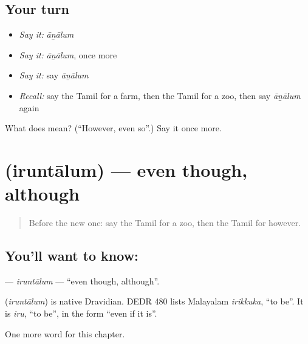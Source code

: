 \subsection*{Your turn}
\begin{itemize}
\raggedright
  \item \emph{Say it:} \emph{āṉālum}
  \item \emph{Say it:} \emph{āṉālum}, once more
  \item \emph{Say it:} say \emph{āṉālum}
  \item \emph{Recall:} say the Tamil for a farm, then the Tamil for a zoo, then say \emph{āṉālum} again
\end{itemize}

\begin{tcolorbox}[breakable,colback=teal!4,colframe=teal!35!black,title={Before you move on}]
What does  mean? (\textquotedblleft{}However, even so\textquotedblright{}.) Say it once more.
\end{tcolorbox}
\section[\texorpdfstring{\ta{இருந்தாலும்} (iruntālum)}{இருந்தாலும் (iruntālum)}]{ (iruntālum) — even though, although}

\label{lesson:TA-C176-iruntalum}



\begin{quote}
Before the new one: say the Tamil for a zoo, then the Tamil for however.
\end{quote}

\subsection*{You'll want to know: }
\textbf{} — \emph{iruntālum} — \textquotedblleft{}even though, although\textquotedblright{}.

\begin{cousinweb}
\textbf{} (\emph{iruntālum}) is native Dravidian. DEDR 480 lists Malayalam \emph{irikkuka}, \textquotedblleft{}to be\textquotedblright{}. It is \emph{iru}, \textquotedblleft{}to be\textquotedblright{}, in the form \textquotedblleft{}even if it is\textquotedblright{}.
\end{cousinweb}

\begin{grammarlens}[title={What you've built}]
One more word for this chapter.
\end{grammarlens}

